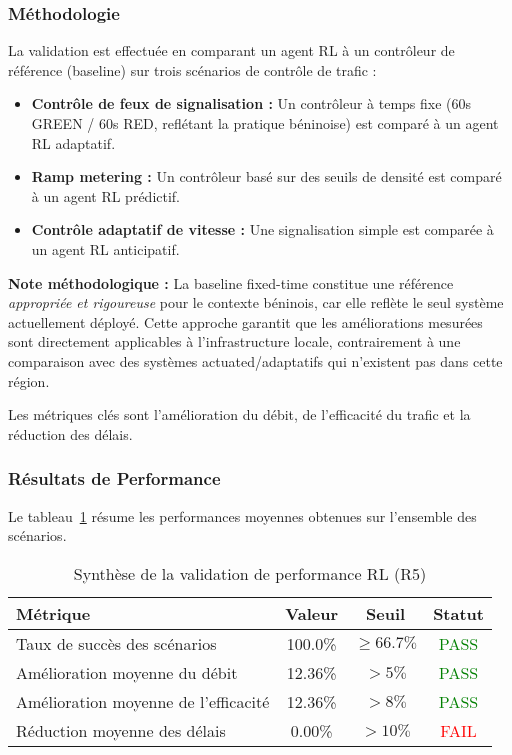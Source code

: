 \subsubsection{Méthodologie}
La validation est effectuée en comparant un agent RL à un contrôleur de référence (baseline) sur trois scénarios de contrôle de trafic :
\begin{itemize}
    \item \textbf{Contrôle de feux de signalisation :} Un contrôleur à temps fixe (60s GREEN / 60s RED, reflétant la pratique béninoise) est comparé à un agent RL adaptatif.
    \item \textbf{Ramp metering :} Un contrôleur basé sur des seuils de densité est comparé à un agent RL prédictif.
    \item \textbf{Contrôle adaptatif de vitesse :} Une signalisation simple est comparée à un agent RL anticipatif.
\end{itemize}

\textbf{Note méthodologique :} La baseline fixed-time constitue une référence \textit{appropriée et rigoureuse} pour le contexte béninois, car elle reflète le seul système actuellement déployé. Cette approche garantit que les améliorations mesurées sont directement applicables à l'infrastructure locale, contrairement à une comparaison avec des systèmes actuated/adaptatifs qui n'existent pas dans cette région.

Les métriques clés sont l'amélioration du débit, de l'efficacité du trafic et la réduction des délais.

\subsubsection{Résultats de Performance}

Le tableau~\ref{tab:rl_performance_summary_76} résume les performances moyennes obtenues sur l'ensemble des scénarios.

\begin{table}[h!]
\centering
\caption{Synthèse de la validation de performance RL (R5)}
\label{tab:rl_performance_summary_76}
\begin{tabular}{|l|c|c|c|}
\hline
\textbf{Métrique} & \textbf{Valeur} & \textbf{Seuil} & \textbf{Statut} \\
\hline
Taux de succès des scénarios & 100.0\% & $\geq 66.7\%$ & \textcolor{green}{PASS} \\
Amélioration moyenne du débit & 12.36\% & $> 5\%$ & \textcolor{green}{PASS} \\
Amélioration moyenne de l'efficacité & 12.36\% & $> 8\%$ & \textcolor{green}{PASS} \\
Réduction moyenne des délais & 0.00\% & $> 10\%$ & \textcolor{red}{FAIL} \\
\hline
\end{tabular}
\end{table}

